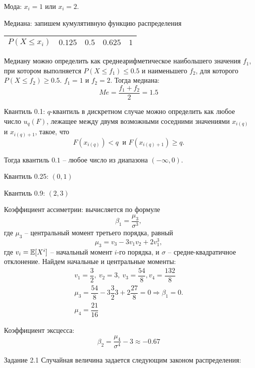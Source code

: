 \documentclass[12pt]{report}
\begin{document}
\begin{solution}
    Мода: $x_i=1$ или $x_i=2$.
    \par
    Медиана: запишем кумулятивную функцию распределения
    \begin{center}
        \begin{tabular}{|l|l|l|l|l|}
            \hline
            $P(X \leq x_i)$ & $0.125$ & $0.5$ & $0.625$ & $1$ \\ \hline
        \end{tabular}
    \end{center}
    \par
    Медиану можно определить как среднеарифметическое наибольшего значения $f_1$, при котором выполняется $P(X \leq f_1) \leq 0.5$ и наименьшего $f_2$, для которого $P(X \leq f_2) \geq 0.5$. $f_1 = 1$ и $f_2 = 2$. Тогда медиана:
    \[
        Me = \dfrac{f_1 + f_2}{2} =  1.5 
    \]
    \par 
    Квантиль 0.1: $q$-квантиль в дискретном случае можно определить как любое число $u_q(F)$, лежащее между двумя возможными соседними значениями $x_{i(q)}$ и $x_{i(q)+1}$, такое, что
    \[
       F(x_{i(q)}) < q \ \text{ и } F(x_{i(q) + 1}) \geq q.  
    \]
    \par
    Тогда квантиль $0.1$ -- любое число из диапазона $(-\infty, 0)$.
    \par 
    Квантиль 0.25: $(0, 1)$
    \par
    Квантиль 0.9: $(2,3)$
    \par
    Коэффициент ассиметрии: вычисляется по формуле
    \[
        \beta_1 = \dfrac{\mu_3}{\sigma^3},  
    \]
    где $\mu_3$ -- центральный момент третьего порядка, равный 
    \[
        \mu_3 = v_3 - 3v_1v_2 + 2v_1^3,
    \]
    где $v_i = \mathbb{E} [X^i]$ -- начальный момент $i$-го порядка, и $\sigma$ -- средне-квадратичное отклонение.
    Найдем начальные и центральные моменты:
    \begin{gather*}
        v_1 = \dfrac{3}{2}, \ v_2 = 3, \ v_3 = \dfrac{54}{8}, v_4 = \dfrac{132}{8}\\
        \mu_3 = \dfrac{54}{8} - 3 \dfrac{3}{2} 3 + 2\dfrac{27}{8} = 0 \Rightarrow \beta_1 = 0.\\
        \mu_4 = \dfrac{21}{16}
    \end{gather*} 
    \par 
    Коэффициент эксцесса:
    \[
        \beta_2 = \dfrac{\mu_4}{\sigma^4} - 3 \approx -0.67
    \]
\end{solution}
\par
Задание 2.1 Случайная величина задается следующим законом распределения:
\end{document}
